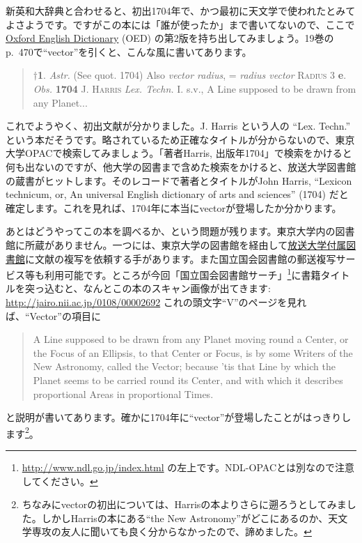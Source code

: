 新英和大辞典と合わせると、初出1704年で、かつ最初に天文学で使われたとみてよさようです。ですがこの本には「誰が使ったか」まで書いてないので、ここで\href{http://www.oed.com/}{Oxford English Dictionary} (OED) の第2版を持ち出してみましょう。19巻のp.~470で``vector''を引くと、こんな風に書いてあります。

\begin{quotation}
$\dagger$\textbf{1}. \textit{Astr.} (See quot. 1704) Also \textit{vector radius}, = \textit{radius vector} \textsc{Radius} 3 \textbf{e}. \textit{Obs.}
\textbf{1704} J. \textsc{Harris} \textit{Lex. Techn.} I. s.v., A Line supposed to be drawn from any Planet...
\end{quotation}

これでようやく、初出文献が分かりました。J.  Harris という人の ``Lex. Techn.'' という本だそうです。略されているため正確なタイトルが分からないので、東京大学OPACで検索してみましょう。「著者Harris, 出版年1704」で検索をかけると何も出ないのですが、他大学の図書まで含めた検索をかけると、放送大学図書館の蔵書がヒットします。そのレコードで著者とタイトルがJohn Harris, ``Lexicon technicum, or, An universal English dictionary of arts and sciences'' (1704) だと確定します。これを見れば、1704年に本当にvectorが登場したか分かります。

あとはどうやってこの本を調べるか、という問題が残ります。東京大学内の図書館に所蔵がありません。一つには、東京大学の図書館を経由して\href{http://lib.ouj.ac.jp/}{放送大学付属図書館}に文献の複写を依頼する手があります。また国立国会図書館の郵送複写サービス等も利用可能です。ところが今回「国立国会図書館サーチ」\footnote{\url{http://www.ndl.go.jp/index.html} の左上です。NDL-OPACとは別なので注意してください。}に書籍タイトルを突っ込むと、なんとこの本のスキャン画像が出てきます: \url{http://jairo.nii.ac.jp/0108/00002692} これの頭文字``V''のページを見れば、``Vector''の項目に\vspace{-0.5zw}
\begin{quotation}
A Line supposed to be drawn from any Planet moving round a Center, or the Focus of an Ellipsis, to that Center or Focus, is by some Writers of the New Astronomy, called the Vector; because 'tis that Line by which the Planet seems to be carried round its Center, and with which it describes proportional Areas in proportional Times.
\end{quotation}\vspace{-0.5zw}
と説明が書いてあります。確かに1704年に``vector''が登場したことがはっきりします\footnote{ちなみにvectorの初出については、Harrisの本よりさらに遡ろうとしてみました。しかしHarrisの本にある``the New Astronomy''がどこにあるのか、天文学専攻の友人に聞いても良く分からなかったので、諦めました。}。

